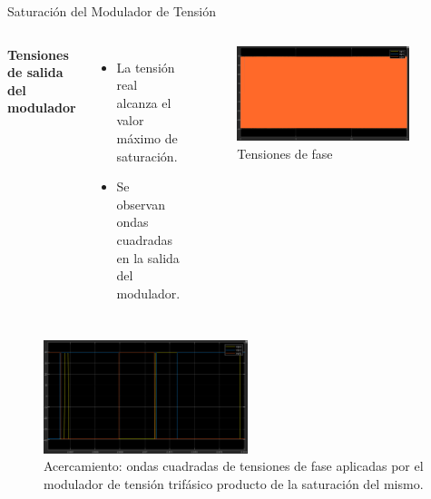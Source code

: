 \documentclass[12pt]{beamer}
\begin{document}
\begin{frame}{Saturación del Modulador de Tensión}
    \begin{columns}
        \textbf{Tensiones de salida del modulador}
        \begin{itemize}
            \item La tensión real alcanza el valor máximo de saturación.
            \item Se observan ondas cuadradas en la salida del modulador.
        \end{itemize}
        \begin{figure}
            \centering
            \includegraphics[width=0.9\textwidth]{Imagenes/Tensiones_Aplicadas_ModuladorTNL.png}
            \caption{Tensiones de fase}
        \end{figure}
    \end{columns}
    \begin{figure}
            \centering
            \includegraphics[width=0.53\textwidth]{Imagenes/Acercamiento_Tensiones_Aplicadas_ModuladorTNL.png}
            \caption{Acercamiento: ondas cuadradas de tensiones de fase aplicadas por el modulador de tensión trifásico producto de la saturación del mismo.}
        \end{figure}
\end{frame}
\end{document}
